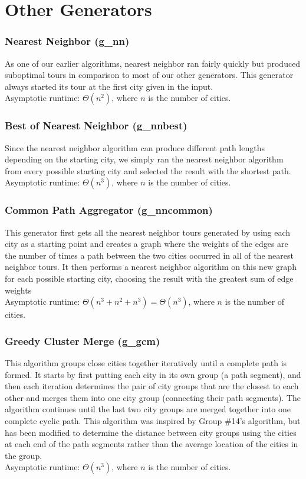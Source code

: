 \documentclass{article}
\begin{document}
\part*{Other Generators}

\section*{Nearest Neighbor (g\_nn)}

As one of our earlier algorithms, nearest neighbor ran fairly quickly but
produced suboptimal tours in comparison to most of our other generators. This
generator always started its tour at the first city given in the
input.\\Asymptotic runtime: $\Theta (n^2)$, where $n$ is the number of cities.

\section*{Best of Nearest Neighbor (g\_nnbest)}

Since the nearest neighbor algorithm can produce different path lengths
depending on the starting city, we simply ran the nearest neighbor algorithm
from every possible starting city and selected the result with the shortest
path.\\Asymptotic runtime: $\Theta (n^3)$, where $n$ is the number of cities.

\section*{Common Path Aggregator (g\_nncommon)}

This generator first gets all the nearest neighbor tours generated by using
each city as a starting point and creates a graph where the weights of the
edges are the number of times a path between the two cities occurred in all of
the nearest neighbor tours. It then performs a nearest neighbor algorithm on
this new graph for each possible starting city, choosing the result with the
greatest sum of edge weights \\Asymptotic runtime: $\Theta (n^3 + n^2 + n^3) =
\Theta (n^3)$, where $n$ is the number of cities.

\section*{Greedy Cluster Merge (g\_gcm)}

This algorithm groups close cities together iteratively until a complete path
is formed. It starts by first putting each city in its own group (a path
segment), and then each iteration determines the pair of city groups that are
the closest to each other and merges them into one city group (connecting their
path segments). The algorithm continues until the last two city groups are
merged together into one complete cyclic path. This algorithm was inspired by
Group \#14's algorithm, but has been modified to determine the distance between
city groups using the cities at each end of the path segments rather than the
average location of the cities in the group.\\Asymptotic runtime: $\Theta
(n^3)$, where $n$ is the number of cities.
\end{document}
